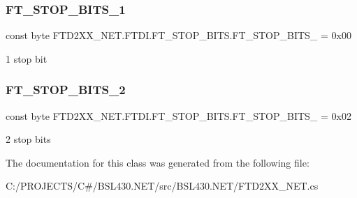 \subsubsection{\texorpdfstring{FT\_STOP\_BITS\_1}{FT\_STOP\_BITS\_1}}
{\footnotesize\ttfamily const byte F\+T\+D2\+X\+X\+\_\+\+N\+E\+T.\+F\+T\+D\+I.\+F\+T\+\_\+\+S\+T\+O\+P\+\_\+\+B\+I\+T\+S.\+F\+T\+\_\+\+S\+T\+O\+P\+\_\+\+B\+I\+T\+S\+\_ = 0x00}



1 stop bit 

\mbox{\label{class_f_t_d2_x_x___n_e_t_1_1_f_t_d_i_1_1_f_t___s_t_o_p___b_i_t_s_afa8ab2761619e09e19f330bdd35fbf74}} 
\subsubsection{\texorpdfstring{FT\_STOP\_BITS\_2}{FT\_STOP\_BITS\_2}}
{\footnotesize\ttfamily const byte F\+T\+D2\+X\+X\+\_\+\+N\+E\+T.\+F\+T\+D\+I.\+F\+T\+\_\+\+S\+T\+O\+P\+\_\+\+B\+I\+T\+S.\+F\+T\+\_\+\+S\+T\+O\+P\+\_\+\+B\+I\+T\+S\+\_ = 0x02}



2 stop bits 



The documentation for this class was generated from the following file\+:\begin{DoxyCompactItemize}
\item 
C\+:/\+P\+R\+O\+J\+E\+C\+T\+S/\+C\#/\+B\+S\+L430.\+N\+E\+T/src/\+B\+S\+L430.\+N\+E\+T/F\+T\+D2\+X\+X\+\_\+\+N\+E\+T.\+cs\end{DoxyCompactItemize}
